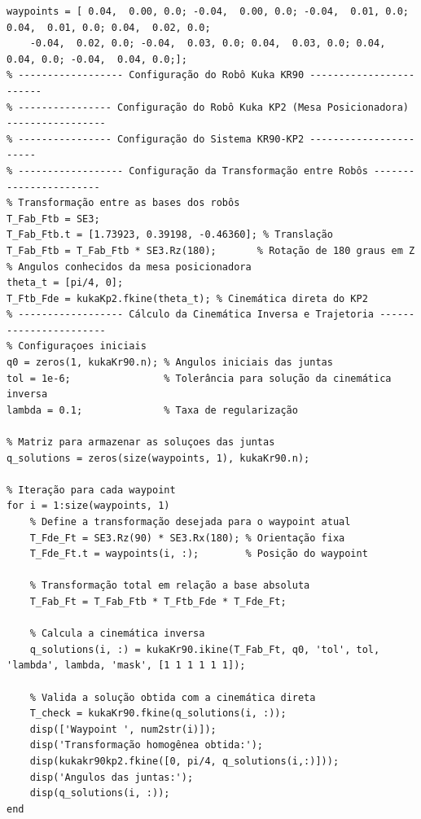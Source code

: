 \documentclass[10pt]{article}
\begin{document}
\begin{lstlisting}[caption={Código da Cinemática Inversa}, label={code:subsecao26}]
% Configuração dos Waypoints
waypoints = [ 0.04,  0.00, 0.0; -0.04,  0.00, 0.0; -0.04,  0.01, 0.0; 0.04,  0.01, 0.0; 0.04,  0.02, 0.0;
    -0.04,  0.02, 0.0; -0.04,  0.03, 0.0; 0.04,  0.03, 0.0; 0.04,  0.04, 0.0; -0.04,  0.04, 0.0;];
% ------------------ Configuração do Robô Kuka KR90 ------------------------
% ---------------- Configuração do Robô Kuka KP2 (Mesa Posicionadora) -----------------
% ---------------- Configuração do Sistema KR90-KP2 -----------------------
% ------------------ Configuração da Transformação entre Robôs -----------------------
% Transformação entre as bases dos robôs
T_Fab_Ftb = SE3;
T_Fab_Ftb.t = [1.73923, 0.39198, -0.46360]; % Translação
T_Fab_Ftb = T_Fab_Ftb * SE3.Rz(180);       % Rotação de 180 graus em Z
% Angulos conhecidos da mesa posicionadora
theta_t = [pi/4, 0]; 
T_Ftb_Fde = kukaKp2.fkine(theta_t); % Cinemática direta do KP2
% ------------------ Cálculo da Cinemática Inversa e Trajetoria -----------------------
% Configuraçoes iniciais
q0 = zeros(1, kukaKr90.n); % Angulos iniciais das juntas
tol = 1e-6;                % Tolerância para solução da cinemática inversa
lambda = 0.1;              % Taxa de regularização

% Matriz para armazenar as soluçoes das juntas
q_solutions = zeros(size(waypoints, 1), kukaKr90.n);

% Iteração para cada waypoint
for i = 1:size(waypoints, 1)
    % Define a transformação desejada para o waypoint atual
    T_Fde_Ft = SE3.Rz(90) * SE3.Rx(180); % Orientação fixa
    T_Fde_Ft.t = waypoints(i, :);        % Posição do waypoint
    
    % Transformação total em relação a base absoluta
    T_Fab_Ft = T_Fab_Ftb * T_Ftb_Fde * T_Fde_Ft;
    
    % Calcula a cinemática inversa
    q_solutions(i, :) = kukaKr90.ikine(T_Fab_Ft, q0, 'tol', tol, 'lambda', lambda, 'mask', [1 1 1 1 1 1]);
    
    % Valida a solução obtida com a cinemática direta
    T_check = kukaKr90.fkine(q_solutions(i, :));
    disp(['Waypoint ', num2str(i)]);
    disp('Transformação homogênea obtida:');
    disp(kukakr90kp2.fkine([0, pi/4, q_solutions(i,:)]));
    disp('Angulos das juntas:');
    disp(q_solutions(i, :));
end
\end{lstlisting}

\newpage
\end{document}

